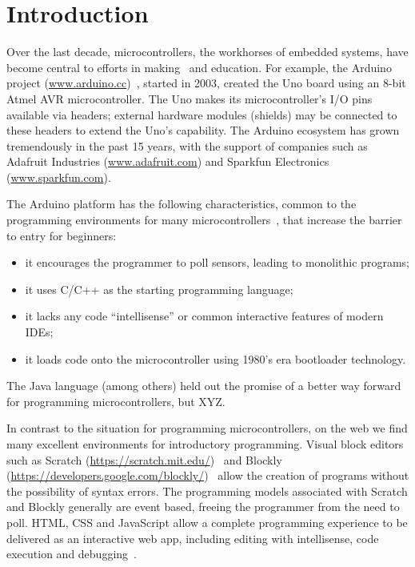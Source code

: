 \section{Introduction}
\label{sec:intro}

Over the last decade, microcontrollers, the workhorses of embedded systems, have become
central to efforts in making~\cite{dougherty2012maker} and education. For example, the Arduino project
(\url{www.arduino.cc})~\cite{buildingArduino2014},
started in 2003, created the Uno board using an 8-bit Atmel
AVR microcontroller. The Uno makes its microcontroller's I/O pins available via headers;
external hardware modules (shields) may be connected to these headers to extend
the Uno's capability. The Arduino ecosystem has grown tremendously in the past 15 years,
with the support of companies such as Adafruit Industries (\url{www.adafruit.com}) and
Sparkfun Electronics (\url{www.sparkfun.com}).

The Arduino platform has the following characteristics, common to the programming
environments for many microcontrollers~\cite{XYZ}, that increase the barrier to entry for beginners:
\begin{itemize}
\item it encourages the programmer to poll sensors, leading to monolithic programs;
\item it uses C/C++ as the starting programming language;
\item it lacks any code ``intellisense'' or common interactive features of modern IDEs;
\item it loads code onto the microcontroller using 1980's era bootloader technology.
\end{itemize}

The Java language (among others) held out the promise of a better way forward for 
programming microcontrollers, but XYZ.  

In contrast to the situation for programming microcontrollers, 
on the web we find many excellent environments for introductory programming.
Visual block editors such as Scratch (\url{https://scratch.mit.edu/})~\cite{ScratchCACM2009,BlocksBeyondCACM2017}
and Blockly (\url{https://developers.google.com/blockly/})~\cite{Blocky2015}
allow the creation of programs without the possibility of syntax errors.
The programming models associated with Scratch and Blockly generally are
event based, freeing the programmer from the need to poll.
HTML, CSS and JavaScript allow a complete programming experience to be delivered as an interactive
web app, including editing with intellisense, code execution and debugging~\cite{Monaco}. 

